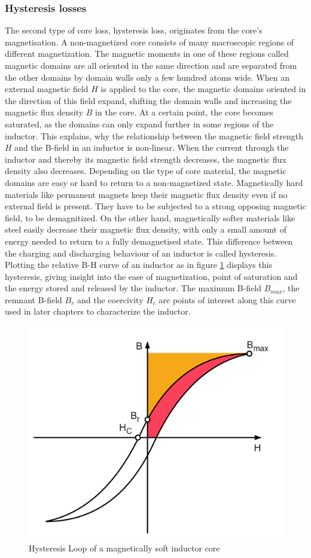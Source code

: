 \subsubsection{Hysteresis losses}
The second type of core loss, hysteresis loss, originates from the core's magnetisation. A non-magnetized core consists of many macroscopic regions of different magnetization. The magnetic moments in one of these regions called magnetic domains are all oriented in the same direction and are separated from the other domains by domain walls only a few hundred atoms wide. When an external magnetic field $H$ is applied to the core, the magnetic domains oriented in the direction of this field expand, shifting the domain walls and increasing the magnetic flux density $B$ in the core. At a certain point, the core becomes saturated, as the domains can only expand further in some regions of the inductor. This explains, why the relationship between the magnetic field strength $H$ and the B-field in an inductor is non-linear. When the current through the inductor and thereby its magnetic field strength decreases, the magnetic flux density also decreases. Depending on the type of core material, the magnetic domains are easy or hard to return to a non-magnetized state. Magnetically hard materials like permanent magnets keep their magnetic flux density even if no external field is present. They have to be subjected to a strong opposing magnetic field, to be demagnitized. On the other hand, magnetically softer materials like steel easily decrease their magnetic flux density, with only a small amount of energy needed to return to a fully demagnetised state. This difference between the charging and discharging behaviour of an inductor is called hysteresis.\\
Plotting the relative B-H curve of an inductor as in figure \ref{fig:b-hcurve} displays this hysteresis, giving insight into the ease of magnetization, point of saturation and the energy stored and released by the inductor. 
The maximum B-field $B_{max}$, the remnant B-field $B_r$ and the coercivity $H_c$ are points of interest along this curve used in later chapters to characterize the inductor.
\begin{figure}[H]
    \centering
    \includegraphics[width=0.6\linewidth]{Bilder//Kapitel2/Hysteresiscurve.png}
    \caption{Hysteresis Loop of a magnetically soft inductor core}
    \label{fig:b-hcurve}
\end{figure}
